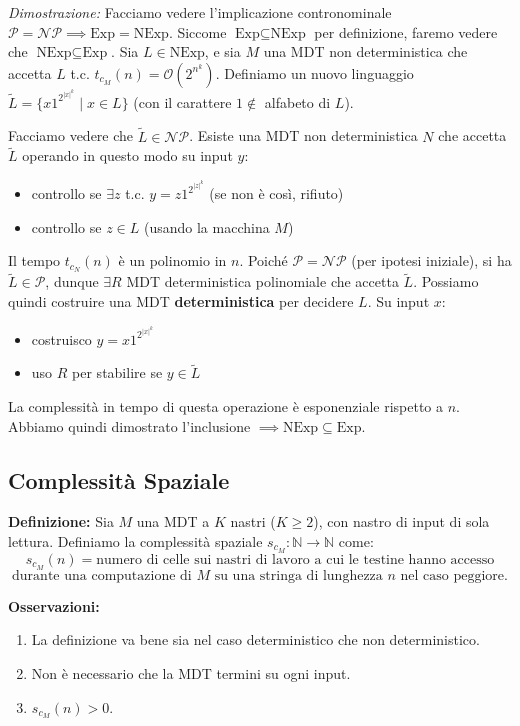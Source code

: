 \textit{Dimostrazione:} Facciamo vedere l'implicazione contronominale $\mathcal{P} = \mathcal{NP} \implies \text{Exp} = \text{NExp}$. Siccome $\text{Exp} \subseteq \text{NExp}$ per definizione, faremo vedere che $\text{NExp} \subseteq \text{Exp}$.
Sia $L \in \text{NExp}$, e sia $M$ una MDT non deterministica che accetta $L$ t.c. $t_{c_M}(n) = \mathcal{O}(2^{n^k})$.
Definiamo un nuovo linguaggio $\tilde{L} = \{ x 1^{2^{|x|^k}} \mid x \in L \}$ (con il carattere $1 \notin$ alfabeto di $L$).

Facciamo vedere che $\tilde{L} \in \mathcal{NP}$. Esiste una MDT non deterministica $N$ che accetta $\tilde{L}$ operando in questo modo su input $y$:
\begin{itemize}
    \item controllo se $\exists z$ t.c. $y = z 1^{2^{|z|^k}}$ (se non è così, rifiuto)
    \item controllo se $z \in L$ (usando la macchina $M$)
\end{itemize}
Il tempo $t_{c_N}(n)$ è un polinomio in $n$.
Poiché $\mathcal{P} = \mathcal{NP}$ (per ipotesi iniziale), si ha $\tilde{L} \in \mathcal{P}$, dunque $\exists R$ MDT deterministica polinomiale che accetta $\tilde{L}$.
Possiamo quindi costruire una MDT \textbf{deterministica} per decidere $L$. Su input $x$:
\begin{itemize}
    \item costruisco $y = x 1^{2^{|x|^k}}$
    \item uso $R$ per stabilire se $y \in \tilde{L}$
\end{itemize}
La complessità in tempo di questa operazione è esponenziale rispetto a $n$. Abbiamo quindi dimostrato l'inclusione $\implies \text{NExp} \subseteq \text{Exp}$.

\vspace{0.8cm}

\subsection{Complessità Spaziale}

\textbf{Definizione:} Sia $M$ una MDT a $K$ nastri ($K \ge 2$), con nastro di input di sola lettura. Definiamo la complessità spaziale $s_{c_M}: \mathbb{N} \to \mathbb{N}$ come:
$$s_{c_M}(n) = \text{numero di celle sui nastri di lavoro a cui le testine hanno accesso} $$
$$ \text{durante una computazione di } M \text{ su una stringa di lunghezza } n \text{ nel caso peggiore.} $$

\newpage{}
\textbf{Osservazioni:}
\begin{enumerate}
    \item La definizione va bene sia nel caso deterministico che non deterministico.
    \item Non è necessario che la MDT termini su ogni input.
    \item $s_{c_M}(n) > 0$.
\end{enumerate}

